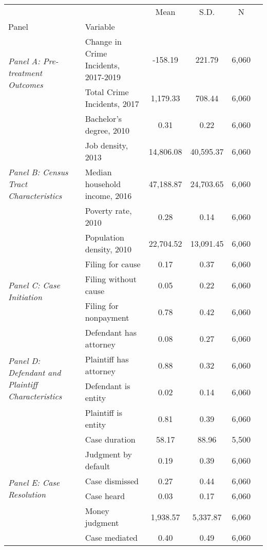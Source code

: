 \begin{tabular}{llcccc}
\toprule
 &  & Mean & S.D. & N \\
Panel & Variable &  &  &  \\
\midrule
\multirow[c]{2}{4cm}{\textit{Panel A: Pre-treatment Outcomes}} & Change in Crime Incidents, 2017-2019 & -158.19 & 221.79 & 6,060 \\
 & Total Crime Incidents, 2017 & 1,179.33 & 708.44 & 6,060 \\
\cline{1-5}
\multirow[c]{5}{4cm}{\textit{Panel B: Census Tract Characteristics}} & Bachelor's degree, 2010 & 0.31 & 0.22 & 6,060 \\
 & Job density, 2013 & 14,806.08 & 40,595.37 & 6,060 \\
 & Median household income, 2016 & 47,188.87 & 24,703.65 & 6,060 \\
 & Poverty rate, 2010 & 0.28 & 0.14 & 6,060 \\
 & Population density, 2010 & 22,704.52 & 13,091.45 & 6,060 \\
\cline{1-5}
\multirow[c]{3}{4cm}{\textit{Panel C: Case Initiation}} & Filing for cause & 0.17 & 0.37 & 6,060 \\
 & Filing without cause & 0.05 & 0.22 & 6,060 \\
 & Filing for nonpayment & 0.78 & 0.42 & 6,060 \\
\cline{1-5}
\multirow[c]{4}{4cm}{\textit{Panel D: Defendant and Plaintiff Characteristics}} & Defendant has attorney & 0.08 & 0.27 & 6,060 \\
 & Plaintiff has attorney & 0.88 & 0.32 & 6,060 \\
 & Defendant is entity & 0.02 & 0.14 & 6,060 \\
 & Plaintiff is entity & 0.81 & 0.39 & 6,060 \\
\cline{1-5}
\multirow[c]{6}{4cm}{\textit{Panel E: Case Resolution}} & Case duration & 58.17 & 88.96 & 5,500 \\
 & Judgment by default & 0.19 & 0.39 & 6,060 \\
 & Case dismissed & 0.27 & 0.44 & 6,060 \\
 & Case heard & 0.03 & 0.17 & 6,060 \\
 & Money judgment & 1,938.57 & 5,337.87 & 6,060 \\
 & Case mediated & 0.40 & 0.49 & 6,060 \\
\cline{1-5}
\bottomrule
\end{tabular}
